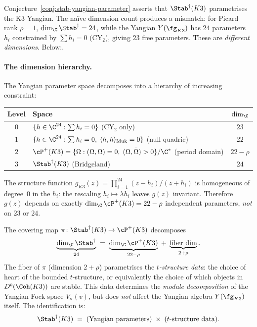 Conjecture~\ref{conj:stab-yangian-parameter} asserts that $\Stab^\dagger(K3)$ parametrises the K3 Yangian. The na\"ive dimension count produces a mismatch: for Picard rank $\rho = 1$, $\dim_\C \Stab^\dagger = 24$, while the Yangian $Y(\fg_{K3})$ has $24$ parameters $h_i$ constrained by $\sum h_i = 0$ (CY$_2$), giving $23$ free parameters. These are \emph{different dimensions}. Below:.

\paragraph{The dimension hierarchy.}
The Yangian parameter space decomposes into a hierarchy of increasing constraint:
\begin{center}
\renewcommand{\arraystretch}{1.2}
\begin{tabular}{clc}
\textbf{Level} & \textbf{Space} & $\dim_\C$ \\
\hline
$0$ & $\{h \in \C^{24} : \textstyle\sum h_i = 0\}$ (CY$_2$ only) & $23$ \\
$1$ & $\{h \in \C^{24} : \textstyle\sum h_i = 0, \; \langle h, h\rangle_{\mathrm{Muk}} = 0\}$ (null quadric) & $22$ \\
$2$ & $\cP^+(K3) = \{\Omega : (\Omega, \Omega) = 0, \; (\Omega, \bar\Omega) > 0\}/\C^*$ (period domain) & $22 - \rho$ \\
$3$ & $\Stab^\dagger(K3)$ (Bridgeland) & $24$ \\
\end{tabular}
\end{center}
The structure function $g_{K3}(z) = \prod_{i=1}^{24} (z - h_i)/(z + h_i)$ is homogeneous of degree~$0$ in the $h_i$: the rescaling $h_i \mapsto \lambda h_i$ leaves $g(z)$ invariant. Therefore $g(z)$ depends on exactly $\dim_\C \cP^+(K3) = 22 - \rho$ independent parameters, \emph{not} on $23$ or $24$.

\begin{conjecture}
\label{conj:stab-dimension-reconciliation}
\ClaimStatusConjectured
The covering map $\pi \colon \Stab^\dagger(K3) \to \cP^+(K3)$ decomposes
\[
 \underbrace{\dim_\C \Stab^\dagger}_{24}
 \;=\;
 \underbrace{\dim_\C \cP^+(K3)}_{22 - \rho}
 \;+\;
 \underbrace{\text{fiber dim}}_{2 + \rho}.
\]
The fiber of $\pi$ (dimension $2 + \rho$) parametrises the \emph{$t$-structure data}: the choice of heart of the bounded $t$-structure, or equivalently the choice of which objects in $D^b(\Coh(K3))$ are stable. This data determines the \emph{module decomposition} of the Yangian Fock space $V_\sigma(v)$, but does \emph{not} affect the Yangian algebra $Y(\fg_{K3})$ itself. The identification is:
\[
 \Stab^\dagger(K3) \;=\; \text{(Yangian parameters)} \;\times\; \text{($t$-structure data)}.
\]
\end{conjecture}

